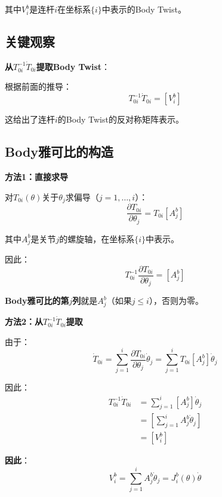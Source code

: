 \documentclass[12pt,a4paper]{article}
\begin{document}
其中$V_i^b$是连杆$i$在坐标系$\{i\}$中表示的Body Twist。

\subsection{关键观察}

\textbf{从$T_{0i}^{-1}\dot{T}_{0i}$提取Body Twist}：

根据前面的推导：
\begin{equation}
T_{0i}^{-1} \dot{T}_{0i} = [V_i^b]
\end{equation}

这给出了连杆$i$的Body Twist的反对称矩阵表示。

\subsection{Body雅可比的构造}

\textbf{方法1：直接求导}

对$T_{0i}(\theta)$关于$\theta_j$求偏导（$j = 1, \ldots, i$）：
\begin{equation}
\frac{\partial T_{0i}}{\partial \theta_j} = T_{0i} [A_j^b]
\end{equation}

其中$A_j^b$是关节$j$的螺旋轴，在坐标系$\{i\}$中表示。

因此：
\begin{equation}
T_{0i}^{-1} \frac{\partial T_{0i}}{\partial \theta_j} = [A_j^b]
\end{equation}

\textbf{Body雅可比的第$j$列}就是$A_j^b$（如果$j \leq i$），否则为零。

\textbf{方法2：从$T_{0i}^{-1}\dot{T}_{0i}$提取}

由于：
\begin{equation}
\dot{T}_{0i} = \sum_{j=1}^{i} \frac{\partial T_{0i}}{\partial \theta_j} \dot{\theta}_j = \sum_{j=1}^{i} T_{0i} [A_j^b] \dot{\theta}_j
\end{equation}

因此：
\begin{align}
T_{0i}^{-1} \dot{T}_{0i} &= \sum_{j=1}^{i} [A_j^b] \dot{\theta}_j \\
&= \left[ \sum_{j=1}^{i} A_j^b \dot{\theta}_j \right] \\
&= [V_i^b]
\end{align}

\textbf{因此}：
\begin{equation}
V_i^b = \sum_{j=1}^{i} A_j^b \dot{\theta}_j = J_i^b(\theta) \dot{\theta}
\end{equation}
\end{document}
